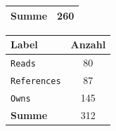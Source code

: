 \begin{table}[htb]
\begin{subtable}[c]{0.3\textwidth}
\begin{tabular}{|l|c|}
                \hline
                \textbf{Summe}  & 260                                  \\ \hline
            \end{tabular}
            \label{table:findingsNewsFiguresContentNodesByClass}
        \end{subtable}
        \begin{subtable}[c]{0.3\textwidth}
            \centering
            \begin{tabular}{|l|c|}
                \hline
                \textbf{Label} & \multicolumn{1}{l|}{\textbf{Anzahl}} \\ \hline
                \texttt{Reads}          & 80                                   \\ \hline
                \texttt{References}     & 87                                   \\ \hline
                \texttt{Owns}           & 145                                  \\ \hline
                \hline
                \textbf{Summe} & 312                                  \\ \hline
                \end{tabular}
            \label{table:findingNewsFiguresEdgesByLabel}
        \end{subtable}


\end{table}

